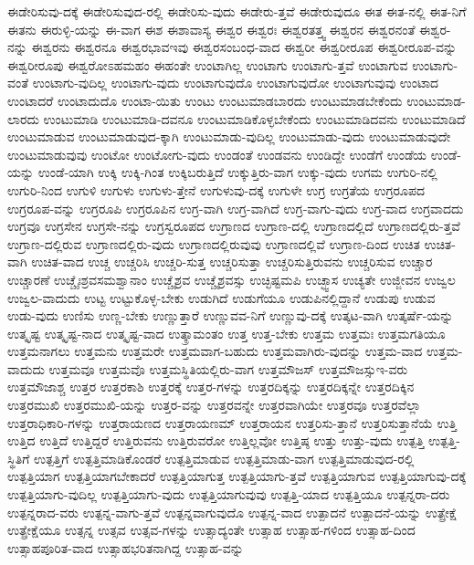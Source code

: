 {ಈಡೇರಿಸುವು-ದಕ್ಕೆ
ಈಡೇರಿಸುವುದ-ರಲ್ಲಿ
ಈಡೇರಿಸು-ವುದು
ಈಡೇರು-ತ್ತವೆ
ಈಡೇರುವುದೂ
ಈತ
ಈತ-ನಲ್ಲಿ
ಈತ-ನಿಗೆ
ಈತನು
ಈರುಳ್ಳಿ-ಯನ್ನು
ಈ-ವಾಗ
ಈಶ
ಈಶಾವಾಸ್ಯ
ಈಶ್ವರ
ಈಶ್ವರಃ
ಈಶ್ವರತತ್ತ್ವ
ಈಶ್ವರನ
ಈಶ್ವರನಂತೆ
ಈಶ್ವರ-ನನ್ನು
ಈಶ್ವರನು
ಈಶ್ವರನೂ
ಈಶ್ವರಭಾವಇವು
ಈಶ್ವರಸಂಬಂಧ-ವಾದ
ಈಶ್ವರೀ
ಈಶ್ವರೀರೂಪ
ಈಶ್ವರೀರೂಪ-ವನ್ನು
ಈಶ್ವರೀರೂಪು
ಈಶ್ವರೋಽಹಮಹಂ
ಈಹಂತೇ
ಉಂಟಾಗಿಲ್ಲ
ಉಂಟಾಗು
ಉಂಟಾಗು-ತ್ತವೆ
ಉಂಟಾಗುವ
ಉಂಟಾಗು-ವಂತೆ
ಉಂಟಾಗು-ವುದಿಲ್ಲ
ಉಂಟಾಗು-ವುದು
ಉಂಟಾಗುವುದೊ
ಉಂಟಾಗುವುದೋ
ಉಂಟಾಗುವುವು
ಉಂಟಾದ
ಉಂಟಾದರೆ
ಉಂಟಾದುದೊ
ಉಂಟಾ-ಯಿತು
ಉಂಟು
ಉಂಟುಮಾಡಬಾರದು
ಉಂಟುಮಾಡಬೇಕೆಂದು
ಉಂಟುಮಾಡ-ಲಾರದು
ಉಂಟುಮಾಡಿ
ಉಂಟುಮಾಡಿ-ದವನೂ
ಉಂಟುಮಾಡಿಕೊಳ್ಳಬೇಕೆಂದು
ಉಂಟುಮಾಡಿದವನು
ಉಂಟುಮಾಡಿದೆ
ಉಂಟುಮಾಡುವ
ಉಂಟುಮಾಡುವುದ-ಕ್ಕಾಗಿ
ಉಂಟುಮಾಡು-ವುದಿಲ್ಲ
ಉಂಟುಮಾಡು-ವುದು
ಉಂಟುಮಾಡುವುದೇ
ಉಂಟುಮಾಡುವುವು
ಉಂಟೋ
ಉಂಟೋಗು-ವುದು
ಉಂಡಂತೆ
ಉಂಡವನು
ಉಂಡಿದ್ದೇ
ಉಂಡೆಗೆ
ಉಂಡೆಯ
ಉಂಡೆ-ಯನ್ನು
ಉಂಡೆ-ಯಾಗಿ
ಉಕ್ಕಿ
ಉಕ್ಕಿ-ಗಿಂತ
ಉಕ್ಕಿಬರುತ್ತಿದೆ
ಉಕ್ಕುತ್ತಿರು-ವಾಗ
ಉಕ್ಕು-ವುದು
ಉಗಮ
ಉಗುರಿ-ನಲ್ಲಿ
ಉಗುರಿ-ನಿಂದ
ಉಗುಳಿ
ಉಗುಳು
ಉಗುಳು-ತ್ತೇನೆ
ಉಗುಳುವು-ದಕ್ಕೆ
ಉಗುಳೇ
ಉಗ್ರ
ಉಗ್ರತೆಯ
ಉಗ್ರರೂಪದ
ಉಗ್ರರೂಪ-ವನ್ನು
ಉಗ್ರರೂಪಿ
ಉಗ್ರರೂಪಿನ
ಉಗ್ರ-ವಾಗಿ
ಉಗ್ರ-ವಾಗಿದೆ
ಉಗ್ರ-ವಾಗು-ವುದು
ಉಗ್ರ-ವಾದ
ಉಗ್ರವಾದದು
ಉಗ್ರವೂ
ಉಗ್ರಸೇನ
ಉಗ್ರಸೇ-ನನ್ನು
ಉಗ್ರಸ್ವರೂಪದ
ಉಗ್ರಾಣದ
ಉಗ್ರಾಣ-ದಲ್ಲಿ
ಉಗ್ರಾಣದಲ್ಲಿದೆ
ಉಗ್ರಾಣದಲ್ಲಿರು-ತ್ತವೆ
ಉಗ್ರಾಣ-ದಲ್ಲಿರುವ
ಉಗ್ರಾಣದಲ್ಲಿರು-ವುದು
ಉಗ್ರಾಣದಲ್ಲಿರುವುವು
ಉಗ್ರಾಣದಲ್ಲಿವೆ
ಉಗ್ರಾಣ-ದಿಂದ
ಉಚಿತ
ಉಚಿತ-ವಾಗಿ
ಉಚಿತ-ವಾದ
ಉಚ್ಚ
ಉಚ್ಚರಿಸಿ
ಉಚ್ಚರಿ-ಸುತ್ತ
ಉಚ್ಚರಿಸುತ್ತಾ
ಉಚ್ಚರಿಸುತ್ತಿರುವನು
ಉಚ್ಚರಿಸುವ
ಉಚ್ಚಾರ
ಉಚ್ಚಾರಣೆ
ಉಚ್ಚೈಃಶ್ರವಸಮಶ್ವಾನಾಂ
ಉಚ್ಚೈಶ್ರವ
ಉಚ್ಚೈಶ್ರವಸ್ಸು
ಉಚ್ಛಿಷ್ಟಮಪಿ
ಉಚ್ಛ್ವಾಸ
ಉಚ್ಯತೇ
ಉಜ್ಜೀವನ
ಉಜ್ವಲ
ಉಜ್ವಲ-ವಾದುದು
ಉಟ್ಟ
ಉಟ್ಟುಕೊಳ್ಳ-ಬೇಕು
ಉಡುಗಿದೆ
ಉಡುಗೆಯೂ
ಉಡುಪಿನಲ್ಲಿದ್ದಾನೆ
ಉಡುಪು
ಉಡುವ
ಉಡು-ವುದು
ಉಣಿಸು
ಉಣ್ಣ-ಬೇಕು
ಉಣ್ಣುತ್ತಾರೆ
ಉಣ್ಣುವವ-ನಿಗೆ
ಉಣ್ಣುವು-ದಕ್ಕೆ
ಉತ್ಕಟ-ವಾಗಿ
ಉತ್ಕರ್ಷೆ-ಯನ್ನು
ಉತ್ಕೃಷ್ಟ
ಉತ್ಕೃಷ್ಟ-ನಾದ
ಉತ್ಕೃಷ್ಟ-ವಾದ
ಉತ್ಕ್ರಾಮಂತಂ
ಉತ್ತ
ಉತ್ತ-ಬೇಕು
ಉತ್ತಮ
ಉತ್ತಮಃ
ಉತ್ತಮಗತಿಯೂ
ಉತ್ತಮನಾಗಲು
ಉತ್ತಮನು
ಉತ್ತಮರೇ
ಉತ್ತಮವಾಗ-ಬಹುದು
ಉತ್ತಮವಾಗಿರು-ವುದನ್ನು
ಉತ್ತಮ-ವಾದ
ಉತ್ತಮ-ವಾದುದು
ಉತ್ತಮವೂ
ಉತ್ತಮವೊ
ಉತ್ತಮಸ್ಥಿತಿಯಲ್ಲಿರು-ವಾಗ
ಉತ್ತಮೌಜಸ್
ಉತ್ತಮೌಜಸ್ಸುಇ-ವರು
ಉತ್ತಮೌಜಾಶ್ಚ
ಉತ್ತರ
ಉತ್ತರಕಾಶಿ
ಉತ್ತರಕ್ಕೆ
ಉತ್ತರ-ಗಳನ್ನು
ಉತ್ತರದಿಕ್ಕನ್ನು
ಉತ್ತರದಿಕ್ಕನ್ನೇ
ಉತ್ತರದಿಕ್ಕಿನ
ಉತ್ತರಮುಖಿ
ಉತ್ತರಮುಖಿ-ಯನ್ನು
ಉತ್ತರ-ವನ್ನು
ಉತ್ತರವನ್ನೇ
ಉತ್ತರವಾಗಿಯೇ
ಉತ್ತರವೂ
ಉತ್ತರವೆಲ್ಲಾ
ಉತ್ತರಾಧಿಕಾರಿ-ಗಳನ್ನು
ಉತ್ತರಾಯಣದ
ಉತ್ತರಾಯಣಮ್
ಉತ್ತರಾಯನ
ಉತ್ತರಿಸು-ತ್ತಾನೆ
ಉತ್ತರಿಸುತ್ತಾನೆಯೆ
ಉತ್ತಿ
ಉತ್ತಿದ
ಉತ್ತಿದೆ
ಉತ್ತಿದ್ದರೆ
ಉತ್ತಿರುವನು
ಉತ್ತಿರುವರೋ
ಉತ್ತಿಲ್ಲವೋ
ಉತ್ತಿಷ್ಠ
ಉತ್ತು
ಉತ್ತು-ವುದು
ಉತ್ಪತ್ತಿ
ಉತ್ಪತ್ತಿ-ಸ್ಥಿತಿಗೆ
ಉತ್ಪತ್ತಿಗೆ
ಉತ್ಪತ್ತಿಮಾಡಿಕೊಂಡರೆ
ಉತ್ಪತ್ತಿಮಾಡುವ
ಉತ್ಪತ್ತಿಮಾಡು-ವಾಗ
ಉತ್ಪತ್ತಿಮಾಡುವುದ-ರಲ್ಲಿ
ಉತ್ಪತ್ತಿಯಾಗ
ಉತ್ಪತ್ತಿಯಾಗಬೇಕಾದರೆ
ಉತ್ಪತ್ತಿಯಾಗುತ್ತ
ಉತ್ಪತ್ತಿಯಾಗು-ತ್ತವೆ
ಉತ್ಪತ್ತಿಯಾಗುವ
ಉತ್ಪತ್ತಿಯಾಗುವು-ದಕ್ಕೆ
ಉತ್ಪತ್ತಿಯಾಗು-ವುದಿಲ್ಲ
ಉತ್ಪತ್ತಿಯಾಗು-ವುದು
ಉತ್ಪತ್ತಿಯಾಗುವುವು
ಉತ್ಪತ್ತಿ-ಯಾದ
ಉತ್ಪತ್ತಿಯೂ
ಉತ್ಪನ್ನರಾ-ದರು
ಉತ್ಪನ್ನರಾದ-ವರು
ಉತ್ಪನ್ನ-ವಾಗು-ತ್ತವೆ
ಉತ್ಪನ್ನವಾಗುವುದೊ
ಉತ್ಪನ್ನ-ವಾದ
ಉತ್ಪಾದನೆ
ಉತ್ಪಾದನೆ-ಯನ್ನು
ಉತ್ಪ್ರೇಕ್ಷೆ
ಉತ್ಪ್ರೇಕ್ಷೆಯೂ
ಉತ್ಸನ್ನ
ಉತ್ಸವ
ಉತ್ಸವ-ಗಳನ್ನು
ಉತ್ಸಾದ್ಯಂತೇ
ಉತ್ಸಾಹ
ಉತ್ಸಾಹ-ಗಳಿಂದ
ಉತ್ಸಾಹ-ದಿಂದ
ಉತ್ಸಾಹಪೂರಿತ-ವಾದ
ಉತ್ಸಾಹಭರಿತನಾಗಿದ್ದ
ಉತ್ಸಾಹ-ವನ್ನು
}

